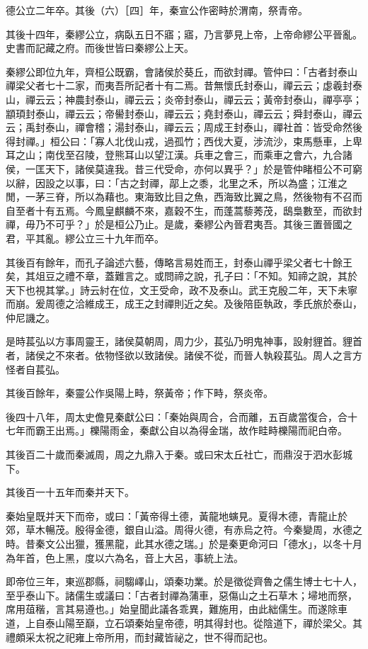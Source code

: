 \begin{pinyinscope}
德公立二年卒。其後（六）［四］年，秦宣公作密畤於渭南，祭青帝。

其後十四年，秦繆公立，病臥五日不寤；寤，乃言夢見上帝，上帝命繆公平晉亂。史書而記藏之府。而後世皆曰秦繆公上天。

秦繆公即位九年，齊桓公既霸，會諸侯於葵丘，而欲封禪。管仲曰：「古者封泰山禪梁父者七十二家，而夷吾所記者十有二焉。昔無懷氏封泰山，禪云云；虙羲封泰山，禪云云；神農封泰山，禪云云；炎帝封泰山，禪云云；黃帝封泰山，禪亭亭；顓頊封泰山，禪云云；帝嚳封泰山，禪云云；堯封泰山，禪云云；舜封泰山，禪云云；禹封泰山，禪會稽；湯封泰山，禪云云；周成王封泰山，禪社首：皆受命然後得封禪。」桓公曰：「寡人北伐山戎，過孤竹；西伐大夏，涉流沙，束馬懸車，上卑耳之山；南伐至召陵，登熊耳山以望江漢。兵車之會三，而乘車之會六，九合諸侯，一匡天下，諸侯莫違我。昔三代受命，亦何以異乎？」於是管仲睹桓公不可窮以辭，因設之以事，曰：「古之封禪，鄗上之黍，北里之禾，所以為盛；江淮之閒，一茅三脊，所以為藉也。東海致比目之魚，西海致比翼之鳥，然後物有不召而自至者十有五焉。今鳳皇麒麟不來，嘉穀不生，而蓬蒿藜莠茂，鴟梟數至，而欲封禪，毋乃不可乎？」於是桓公乃止。是歲，秦繆公內晉君夷吾。其後三置晉國之君，平其亂。繆公立三十九年而卒。

其後百有餘年，而孔子論述六藝，傳略言易姓而王，封泰山禪乎梁父者七十餘王矣，其俎豆之禮不章，蓋難言之。或問禘之說，孔子曰：「不知。知禘之說，其於天下也視其掌。」詩云紂在位，文王受命，政不及泰山。武王克殷二年，天下未寧而崩。爰周德之洽維成王，成王之封禪則近之矣。及後陪臣執政，季氏旅於泰山，仲尼譏之。

是時萇弘以方事周靈王，諸侯莫朝周，周力少，萇弘乃明鬼神事，設射貍首。貍首者，諸侯之不來者。依物怪欲以致諸侯。諸侯不從，而晉人執殺萇弘。周人之言方怪者自萇弘。

其後百餘年，秦靈公作吳陽上畤，祭黃帝；作下畤，祭炎帝。

後四十八年，周太史儋見秦獻公曰：「秦始與周合，合而離，五百歲當復合，合十七年而霸王出焉。」櫟陽雨金，秦獻公自以為得金瑞，故作畦畤櫟陽而祀白帝。

其後百二十歲而秦滅周，周之九鼎入于秦。或曰宋太丘社亡，而鼎沒于泗水彭城下。

其後百一十五年而秦并天下。

秦始皇既并天下而帝，或曰：「黃帝得土德，黃龍地螾見。夏得木德，青龍止於郊，草木暢茂。殷得金德，銀自山溢。周得火德，有赤烏之符。今秦變周，水德之時。昔秦文公出獵，獲黑龍，此其水德之瑞。」於是秦更命河曰「德水」，以冬十月為年首，色上黑，度以六為名，音上大呂，事統上法。

即帝位三年，東巡郡縣，祠騶嶧山，頌秦功業。於是徵從齊魯之儒生博士七十人，至乎泰山下。諸儒生或議曰：「古者封禪為蒲車，惡傷山之土石草木；埽地而祭，席用葅稭，言其易遵也。」始皇聞此議各乖異，難施用，由此絀儒生。而遂除車道，上自泰山陽至巔，立石頌秦始皇帝德，明其得封也。從陰道下，禪於梁父。其禮頗采太祝之祀雍上帝所用，而封藏皆祕之，世不得而記也。


\end{pinyinscope}
